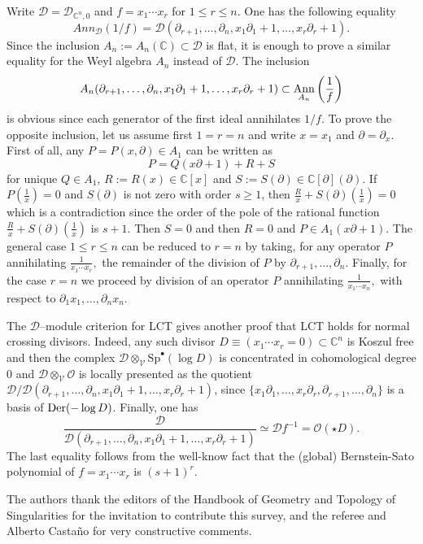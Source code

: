 \documentclass[12pt]{article}
\newcommand{\CC}{\mathbb{C}}
\DeclareMathOperator{\Ann}{\rm Ann}
\DeclareMathOperator{\Der}{\rm Der}
\newcommand{\OO}{\mathcal{O}}
\newcommand{\DD}{\mathcal{D}}
\newcommand{\VV}{\mathcal{V}}
\newcommand{\Sp}{{\mathrm{Sp}}}
\newcommand{\cD}{\DD}
\newcommand{\cO}{\OO}
\begin{document}
Write   $\cD = \cD_{\CC^n,0}$ and $f = x_1\cdots x_r$ for $1\leq r \leq n$. One has the following equality  $$Ann_\cD(1/f) = \cD(\partial_{r+1}, \ldots, \partial_n, x_1\partial_1 +1, \ldots, x_r \partial_r +1).$$ Since the inclusion $A_n:=A_n(\CC) \subset \cD$ is flat, it is enough to prove a similar equality for the Weyl algebra $A_n$ instead of $\cD$.
The inclusion $$ A_n (\partial_{r+1}, \ldots, \partial_n, x_1\partial_1 +1, \ldots, x_r \partial_r +1) \subset \Ann_{A_n}\left(\frac{1}{f}\right)$$ is obvious since each generator of the first ideal annihilates $1/f$.
To prove the opposite inclusion, let us  assume first $1=r=n$ and write $x=x_1$ and $\partial = \partial_{x}$. First of all, any $P=P(x,\partial) \in A_1$ can be written as $$P=Q(x\partial + 1) + R + S$$ for unique $Q\in A_1$, $R:=R(x)\in \CC[x]$ and $S:=S(\partial)\in \CC[\partial](\partial)$. If $P(\frac{1}{x})=0$ and $S(\partial)$ is not zero with order $s\geq 1$, then $\frac{R}{x}+ S(\partial)(\frac{1}{x})=0$ which is a contradiction since the order of the pole of the rational function $\frac{R}{x}+ S(\partial)(\frac{1}{x})$ is $s+1$. Then $S=0$ and then $R=0$ and $P\in A_1(x\partial+1)$. The general case $1\leq r \leq n$ can be reduced to $r=n$ by taking, for any operator $P$ annihilating $\frac{1}{x_1\cdots x_r},$ the remainder of the division of $P$ by $\partial_{r+1},\ldots, \partial_n$. Finally, for the case $r=n$ we proceed  by division of an operator $P$ annihilating $\frac{1}{x_1\cdots x_n},$ with respect to $\partial_1 x_1, \ldots, \partial_n x_n$.

The $\cD$--module criterion for LCT gives another proof that LCT holds for normal crossing divisors. Indeed, any such divisor $D \equiv (x_1\cdots x_r=0) \subset \CC^n$ is Koszul free and then the complex
$\DD \otimes_{\VV}\Sp^\bullet(\log D)$ is concentrated in cohomological degree $0$ and $\DD \otimes_{\VV}\cO$ is locally presented as the quotient $\cD / \cD(\partial_{r+1}, \ldots, \partial_n, x_1\partial_1 +1, \ldots, x_r \partial_r +1)$, since  $\{x_1\partial_1, \ldots, x_r\partial_r,\partial_{r+1},\ldots, \partial_n\}$ is a basis of $\Der(-\log D)$. Finally, one has $$\frac{\cD}{ \cD(\partial_{r+1}, \ldots, \partial_n, x_1\partial_1 +1, \ldots, x_r \partial_r +1)} \simeq \cD f^{-1} = \cO(\star D).$$ The last equality follows from the well-know fact that the (global) Bernstein-Sato polynomial of $f=x_1\cdots x_r$ is $(s+1)^r$.



The authors thank the editors of the Handbook of Geometry and Topology of
Singularities for the invitation to contribute this survey, and the referee and Alberto Castaño for very constructive comments.
\end{document}
